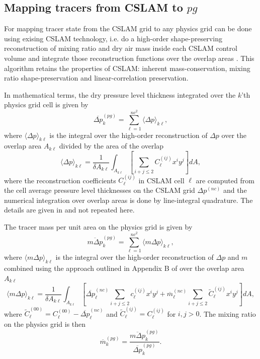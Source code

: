 \subsection{Mapping tracers from CSLAM to $pg$}\label{sec:nctopg}
For mapping tracer state from the CSLAM grid to any physics grid can be done using exising CSLAM technology, i.e. do a high-order shape-preserving reconstruction of mixing ratio and dry air mass inside each CSLAM control volume and integrate those reconstruction functions over the overlap areas \citep{LNU2010JCP,NL2010JCP}. This algorithm retains the properties of CSLAM: inherent mass-conservation, mixing ratio shape-preservation and linear-correlation preservation. 

In mathematical terms, the dry pressure level thickness integrated over the $k$'th physics grid cell is given by
\begin{equation}
\overline{\Delta p}^{(pg)}_k=\sum_{\ell=1}^{nc^2}\langle \Delta p\rangle_{k\ell},
\end{equation}
where $\langle \Delta p\rangle_{k\ell}$ is the integral over the high-order reconstruction of $\Delta p$ over the overlap area $A_{k\ell}$ divided by the area of the overlap
\begin{equation}
\langle \Delta p\rangle_{k\ell}=\frac{1}{\delta A_{k\ell}}\int_{A_{k\ell}}\left[ \sum_{i+j\le 2}C^{(ij)}_\ell x^{i}y^{j}\right] dA,
\end{equation}
where the reconstruction coefficients $C^{(ij)}_\ell$ in CSLAM cell $\ell$ are computed from the cell average pressure level thicknesses on the CSLAM grid $\Delta p^{(nc)}$ and the numerical integration over overlap areas is done by line-integral quadrature. The details are given in \cite{LNU2010JCP} and not repeated here.

The tracer mass per unit area on the physics grid is given by
\begin{equation}
\overline{m\Delta p}^{(pg)}_k=\sum_{\ell=1}^{nc^2}\langle m\Delta p\rangle_{k\ell},
\end{equation}
where $\langle m\Delta p\rangle_{k\ell}$ is the integral over the high-order reconstruction of $\Delta p$ and $m$ combined using the approach outlined in Appendix B of \cite{NL2010JCP} over the overlap area $A_{k\ell}$
\begin{equation}
\langle m\Delta p\rangle_{k\ell}=\frac{1}{\delta A_{k\ell}}\int_{A_{k\ell}}\left[ \overline{\Delta p}_\ell^{(nc)}\sum_{i+j\le 2}c^{(ij)}_\ell x^{i}y^{j}+{\overline{m}}_\ell^{(nc)}\sum_{i+j\le 2}{\tilde{C}}^{(ij)}_\ell x^{i}y^{j}\right] dA,
\end{equation}
where ${\tilde{C}}^{(00)}_\ell=C^{(00)}_\ell-\overline{\Delta p}^{(nc)}_\ell$ and ${\tilde{C}}^{(ij)}_\ell=C^{(ij)}_\ell$ for $i,j>0$. The mixing ratio on the physics grid is then
\begin{equation}
\overline{m}^{(pg)}_k=\frac{\overline{m\Delta p}^{(pg)}_k}{\overline{\Delta p}^{(pg)}_k}.
\end{equation}



